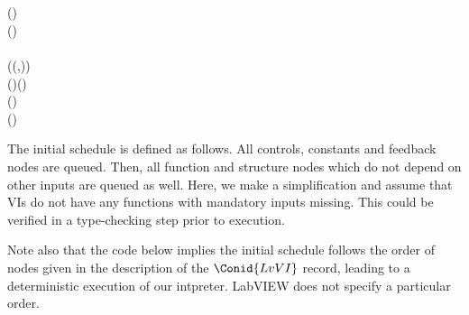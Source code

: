 \begin{hscode}
\>[37]{}\mathrel{=}\;\<[E]%
\\[\blanklineskip]%
\>[4]{}\<[7]%
\>[7]{}\mathbin{::}\to {}\<[E]%
\\
\>[4]{}\<[7]%
\>[7]{}\;(\;){}\<[53]%
\>[53]{}\mathrel{=}\<[E]%
\\
\>[4]{}\<[7]%
\>[7]{}\;(\;){}\<[53]%
\>[53]{}\mathrel{=}\<[E]%
\\
\>[4]{}\<[7]%
\>[7]{}\;\anonymous {}\<[53]%
\>[53]{}\mathrel{=}\;\<[E]%
\\[\blanklineskip]%
\>[4]{}\<[7]%
\>[7]{}\mathbin{::}((,)\to {})\<[E]%
\\
\>[4]{}\<[7]%
\>[7]{}\;\;\mathrel{=}\;(\;)\;(\;)\;\<[E]%
\\[\blanklineskip]%
\>[B]{}\mathbin{::}\to {}\;(\;){}\<[E]%
\\
\>[B]{}\;\mathrel{=}\;(\;\;){}\<[E]%
\ColumnHook
\end{hscode}\resethooks

The initial schedule is defined as follows. All controls, constants and
feedback nodes are queued. Then, all function and structure nodes which do not
depend on other inputs are queued as well. Here, we make a simplification and
assume that VIs do not have any functions with mandatory inputs missing. This
could be verified in a type-checking step prior to execution.

Note also that the code below implies the initial schedule follows the order
of nodes given in the description of the \ensuremath{\Conid{LvVI}} record, leading to a
deterministic execution of our intpreter. LabVIEW does not specify a
particular order.

